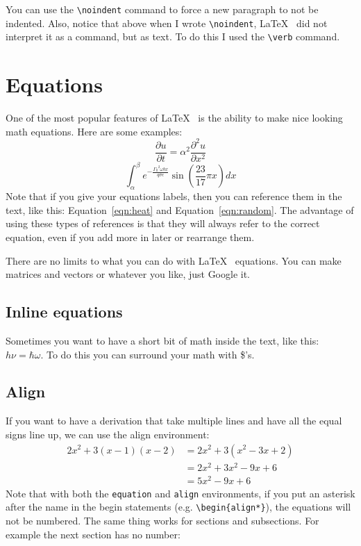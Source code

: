 \documentclass[twocolumn,10 pt,showpacs,preprintnumbers,amsmath,amssymb]{revtex4-1}
\newcommand{\parl}[2]{\frac{\partial #1}{\partial #2}}
\begin{document}
\noindent You can use the \verb_\noindent_ command to force a new
paragraph to not be indented. Also, notice that above when I wrote
\verb_\noindent_, \LaTeX~ did not interpret it as a command, but as
text. To do this I used the \verb_\verb_ command.

\section{Equations}

One of the most popular features of \LaTeX~ is the ability to make nice
looking math equations. Here are some examples: 
\begin{equation}
  \parl{u}{t} = \alpha^2 \parl{^2u}{x^2}
  \label{eqn:heat}
\end{equation}
\begin{equation}
  \int_{\alpha}^{\beta} e^{-\frac{{\Gamma_0}^2\omega b x}{q \sigma \epsilon}}\sin\left(
  \frac{23}{17}\pi x\right)dx
  \label{eqn:random}
\end{equation}
Note that if you give your equations labels, then you can reference them
in the text, like this: Equation~\ref{eqn:heat} and
Equation~\ref{eqn:random}. The advantage of using these types of
references is that they will always refer to the correct equation, even
if you add more in later or rearrange them.

There are no limits to what you can do with \LaTeX~ equations. You can
make matrices and vectors or whatever you like, just Google it.

\subsection{Inline equations}

Sometimes you want to have a short bit of math inside the text, like
this: $h\nu = \hbar\omega$. To do this you can surround your math with
\$'s.

\subsection{Align}

If you want to have a derivation that take multiple lines and have all the equal
signs line up, we can use the align environment:
\begin{align*}
  2x^2 + 3(x-1)(x-2) &= 2x^2 + 3(x^2-3x+2)\\
                     &= 2x^2 + 3x^2 - 9x + 6\\
                     &= 5x^2 - 9x + 6
\end{align*}
Note that with both the \verb_equation_ and \verb_align_ environments,
if you put an asterisk after the name in the begin statements (e.g.
\verb_\begin{align*}_), the equations will not be numbered. The same
thing works for sections and subsections. For example the next section
has no number:
\end{document}
